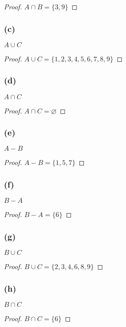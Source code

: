 \documentclass[14pt]{extarticle}
\newcommand{\es}{\varnothing}
\begin{document}
\begin{proof}
  \(A \cap B = \{3, 9\}\)
\end{proof}

\subsubsection{(c)}
\(A \cup C\)

\begin{proof}
  \(A \cup C = \{1, 2, 3, 4, 5, 6, 7, 8, 9\}\)
\end{proof}

\subsubsection{(d)}
\(A \cap C\)

\begin{proof}
  \(A \cap C = \es\)
\end{proof}

\subsubsection{(e)}
\(A - B\)

\begin{proof}
  \(A - B = \{1, 5, 7\}\)
\end{proof}

\subsubsection{(f)}
\(B - A\)

\begin{proof}
  \(B - A = \{6\}\)
\end{proof}

\subsubsection{(g)}
\(B \cup C\)

\begin{proof}
  \(B \cup C = \{2, 3, 4, 6, 8, 9\}\)
\end{proof}

\subsubsection{(h)}
\(B \cap C\)

\begin{proof}
  \(B \cap C = \{6\}\)
\end{proof}
\end{document}
